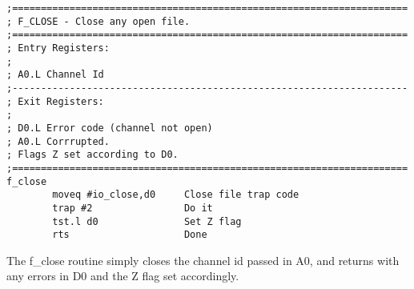 \begin{lstlisting}[firstnumber=1,]
;=====================================================================
; F_CLOSE - Close any open file.
;=====================================================================
; Entry Registers:
;
; A0.L Channel Id
;---------------------------------------------------------------------
; Exit Registers:
;
; D0.L Error code (channel not open)
; A0.L Corrrupted.
; Flags Z set according to D0.
;=====================================================================
f_close
        moveq #io_close,d0     Close file trap code
        trap #2                Do it
        tst.l d0               Set Z flag
        rts                    Done
\end{lstlisting}

The f\_close routine simply closes the channel
    id passed in A0, and returns with any errors in D0 and the Z flag set
    accordingly.


